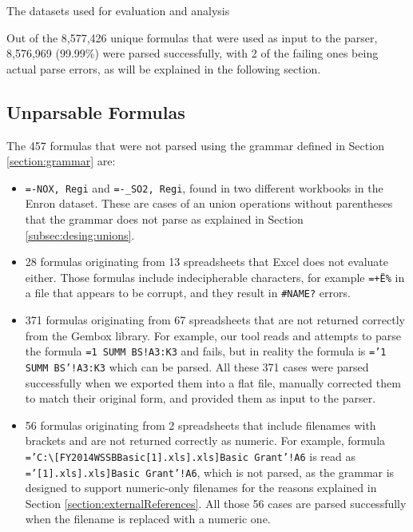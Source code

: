 \documentclass[times]{smrauth}
\begin{document}
\begin{table}[]
	\centering
	\caption{The datasets used for evaluation and analysis}
	\label{table:datasets}
	
\end{table}

Out of the 8,577,426 unique formulas that were used as input to the parser, 8,576,969 (99.99\%) were parsed successfully, with 2 of the failing ones being actual parse errors, as will be explained in the following section.

\subsection{Unparsable Formulas}
\label{subsection:unparsableFormulas}
The 457 formulas that were not parsed using the grammar defined in Section \ref{section:grammar} are:

\begin{itemize}
	\item \texttt{=-NOX, Regi} and \texttt{=-_SO2, Regi}, found in two different workbooks in the Enron dataset. These are cases of an union operations without parentheses that the grammar does not parse as explained in Section \ref{subsec:desing:unions}.
	\item 28 formulas originating from 13 spreadsheets that Excel does not evaluate either. Those formulas include indecipherable characters, for example \texttt{=+Ë\%} in a file that appears to be corrupt, and they result in \texttt{\#NAME?} errors.
	\item 371 formulas originating from 67 spreadsheets that are not returned correctly from the Gembox library. For example, our tool reads and attempts to parse the formula \texttt{=1 SUMM BS!A3:K3} and fails, but in reality the formula is \texttt{='1 SUMM BS'!A3:K3} which can be parsed. All these 371 cases were parsed successfully when we exported them into a flat file, manually corrected them to match their original form, and provided them as input to the parser.
	\item 56 formulas originating from 2 spreadsheets that include filenames with brackets and are not returned correctly as numeric. For example, formula \texttt{='C:\textbackslash[FY2014WSSBBasic[1].xls].xls]Basic Grant'!A6} is read as \texttt{='[1].xls].xls]Basic Grant'!A6}, which is not parsed, as the grammar is designed to support numeric-only filenames for the reasons explained in Section \ref{section:externalReferences}. All those 56 cases are parsed successfully when the filename is replaced with a numeric one.
\end{itemize}
\end{document}
